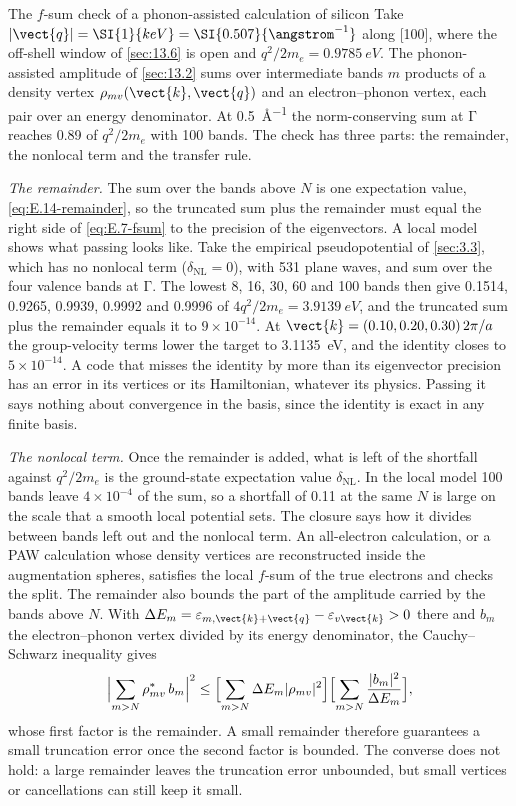 \begin{workedexample}{The $f$-sum check of a phonon-assisted calculation of silicon}\label{we:22-fsum}
Take $|\vect{q}| = \SI{1}{keV} = \SI{0.507}{\angstrom^{-1}}$ along [100], where the off-shell window of \cref{sec:13.6} is open and $q^2/2m_e = \SI{0.9785}{eV}$. The phonon-assisted amplitude of \cref{sec:13.2} sums over intermediate bands $m$ products of a density vertex $\rho_{mv}(\vect{k},\vect{q})$ and an electron--phonon vertex, each pair over an energy denominator. At \SI{0.5}{\angstrom^{-1}} the norm-conserving sum at $\mathrm{\Gamma}$ reaches 0.89 of $q^2/2m_e$ with 100 bands. The check has three parts: the remainder, the nonlocal term and the transfer rule.

\emph{The remainder.} The sum over the bands above $N$ is one expectation value, \cref{eq:E.14-remainder}, so the truncated sum plus the remainder must equal the right side of \cref{eq:E.7-fsum} to the precision of the eigenvectors. A local model shows what passing looks like. Take the empirical pseudopotential of \cref{sec:3.3}, which has no nonlocal term ($\delta_{\mathrm{NL}} = 0$), with 531 plane waves, and sum over the four valence bands at $\mathrm{\Gamma}$. The lowest 8, 16, 30, 60 and 100 bands then give 0.1514, 0.9265, 0.9939, 0.9992 and 0.9996 of $4q^2/2m_e = \SI{3.9139}{eV}$, and the truncated sum plus the remainder equals it to $9\times10^{-14}$. At $\vect{k} = (0.10, 0.20, 0.30)\,2\pi/a$ the group-velocity terms lower the target to \SI{3.1135}{eV}, and the identity closes to $5\times10^{-14}$. A code that misses the identity by more than its eigenvector precision has an error in its vertices or its Hamiltonian, whatever its physics. Passing it says nothing about convergence in the basis, since the identity is exact in any finite basis.

\emph{The nonlocal term.} Once the remainder is added, what is left of the shortfall against $q^2/2m_e$ is the ground-state expectation value $\delta_{\mathrm{NL}}$. In the local model 100 bands leave $4\times10^{-4}$ of the sum, so a shortfall of 0.11 at the same $N$ is large on the scale that a smooth local potential sets. The closure says how it divides between bands left out and the nonlocal term. An all-electron calculation, or a PAW calculation whose density vertices are reconstructed inside the augmentation spheres, satisfies the local $f$-sum of the true electrons and checks the split. The remainder also bounds the part of the amplitude carried by the bands above $N$. With $\Delta E_m = \varepsilon_{m,\vect{k}+\vect{q}} - \varepsilon_{v\vect{k}} > 0$ there and $b_m$ the electron--phonon vertex divided by its energy denominator, the Cauchy--Schwarz inequality gives
\begin{equation*}
  \Bigl|\sum_{m>N}\rho_{mv}^*\,b_m\Bigr|^2 \le \Bigl[\sum_{m>N}\Delta E_m|\rho_{mv}|^2\Bigr]\Bigl[\sum_{m>N}\frac{|b_m|^2}{\Delta E_m}\Bigr] ,
\end{equation*}
whose first factor is the remainder. A small remainder therefore guarantees a small truncation error once the second factor is bounded. The converse does not hold: a large remainder leaves the truncation error unbounded, but small vertices or cancellations can still keep it small.


\end{workedexample}
